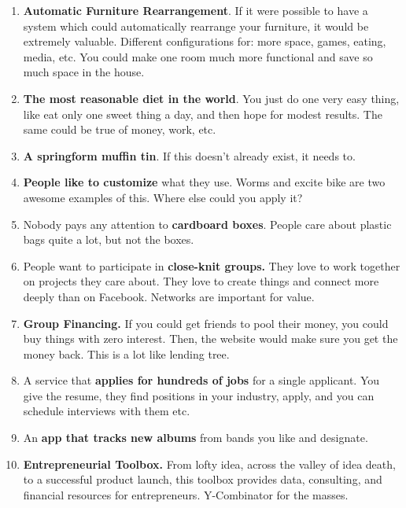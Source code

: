 \documentclass[paper=a4, fontsize=11pt]{scrartcl} %
\numberwithin{equation}{section} %
\numberwithin{figure}{section} %
\numberwithin{table}{section} %
\begin{document}
\begin{enumerate}
\item \textbf{Automatic Furniture Rearrangement}.  If it were possible to have a system which could automatically rearrange your furniture, it would be extremely valuable.  Different configurations for: more space, games, eating, media, etc.  You could make one room much more functional and save so much space in the house.  

\item \textbf{The most reasonable diet in the world}.  You just do one very easy thing, like eat only one sweet thing a day, and then hope for modest results.  The same could be true of money, work, etc. 

\item \textbf{A springform muffin tin}.  If this doesn't already exist, it needs to.  

\item \textbf{People like to customize} what they use.  Worms and excite bike are two awesome examples of this.  Where else could you apply it?

\item Nobody pays any attention to \textbf{cardboard boxes}.  People care about plastic bags quite a lot, but not the boxes. 

\item People want to participate in \textbf{close-knit groups.}  They love to work together on projects they care about.  They love to create things and connect more deeply than on Facebook.  Networks are important for value.  

\item \textbf{Group Financing.}  If you could get friends to pool their money, you could buy things with zero interest.  Then, the website would make sure you get the money back.  This is a lot like lending tree.  

\item A service that \textbf{applies for hundreds of jobs} for a single applicant.  You give the resume, they find positions in your industry, apply, and you can schedule interviews with them etc.  

\item An \textbf{app that tracks new albums} from bands you like and designate.

\item \textbf{Entrepreneurial Toolbox.}  From lofty idea, across the valley of idea death, to a successful product launch, this toolbox provides data, consulting, and financial resources for entrepreneurs.  Y-Combinator for the masses.  


\end{enumerate}
\end{document}
